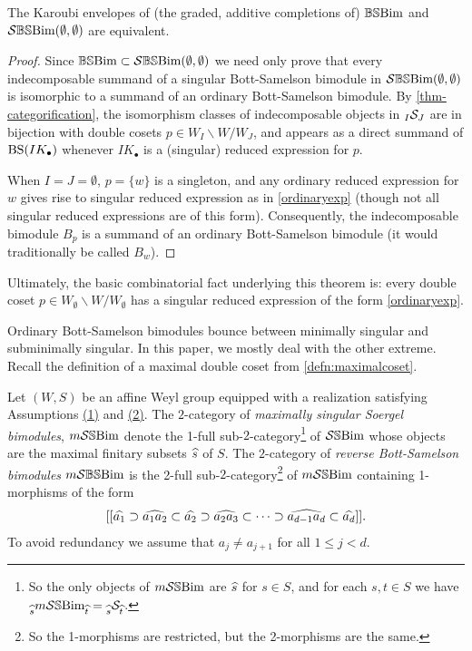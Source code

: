 \begin{theorem} \label{thm:sameKar1} The Karoubi envelopes of (the graded, additive completions of) $\mathbb{BS}\text{Bim}$ and $\mathcal{S}\mathbb{BS}\text{Bim}(\emptyset, \emptyset)$ are equivalent. \end{theorem} 

\begin{proof} Since $\mathbb{BS}\text{Bim} \subset \mathcal{S}\mathbb{BS}\text{Bim}(\emptyset, \emptyset)$ we need only prove that every indecomposable summand of a singular Bott-Samelson bimodule in $\mathcal{S}\mathbb{BS}\text{Bim}(\emptyset, \emptyset)$ is isomorphic to a summand of an ordinary Bott-Samelson bimodule. By \cref{thm-categorification}, the isomorphism classes of indecomposable objects in ${}_{I}\mathcal{S}_{J}$ are in bijection with double cosets $p \in W_I \backslash W / W_J$, and appears as a direct summand of $\operatorname{BS}(IK_{\bullet})$ whenever $IK_{\bullet}$ is a (singular) reduced expression for $p$.

When $I = J = \emptyset$, $p = \{w\}$ is a singleton, and any ordinary reduced expression for $w$ gives rise to singular reduced expression as in \eqref{ordinaryexp} (though not all singular reduced expressions are of this form). Consequently, the indecomposable bimodule $B_p$ is a summand of an ordinary Bott-Samelson bimodule (it would traditionally be called $B_w$).
\end{proof}

Ultimately, the basic combinatorial fact underlying this theorem is: every double coset $p \in W_{\emptyset} \backslash W / W_{\emptyset}$ has a singular reduced expression of the form \eqref{ordinaryexp}.

Ordinary Bott-Samelson bimodules bounce between minimally singular and subminimally singular.
In this paper, we mostly deal with the other extreme. Recall the definition of a maximal double coset from \cref{defn:maximalcoset}.

\begin{defn}
Let $(W,S)$ be an affine Weyl group equipped with a realization satisfying Assumptions \hyperref[assumption 1]{(1)} and \hyperref[assumption 2]{(2)}.
The $2$-category of \emph{maximally singular Soergel bimodules}, $m\mathcal{S}\mathbb{S}\text{Bim}$ denote the 1-full sub-$2$-category\footnote{So the only objects of $m\mathcal{S}\mathbb{S}\text{Bim}$ are $\widehat{s}$ for $s \in S$, and for each $s, t \in S$ we have ${}_{\widehat{s}} m\mathcal{S}\mathbb{S}\text{Bim}_{\widehat{t}} = {}_{\widehat{s}}\mathcal{S}_{\widehat{t}}$.} of $\mathcal{S}\mathbb{S}\text{Bim}$ whose objects are the maximal finitary subsets $\widehat{s}$ of $S$. 
The $2$-category of \emph{reverse Bott-Samelson bimodules} $m\mathcal{S}\mathbb{BS}\text{Bim}$ is the 2-full sub-$2$-category\footnote{So the 1-morphisms are restricted, but the 2-morphisms are the same.} of $m\mathcal{S}\mathbb{S}\text{Bim}$ containing 1-morphisms of the form
\begin{equation} \label{reverseexp} [[\widehat{a_1} \supset \widehat{a_1 a_2} \subset \widehat{a_2} \supset \widehat{a_2 a_3} \subset \cdots \supset \widehat{a_{d-1} a_d} \subset \widehat{a_d}]].\end{equation}
To avoid redundancy we assume that $a_j \ne a_{j+1}$ for all $1 \le j < d$.
\end{defn}


